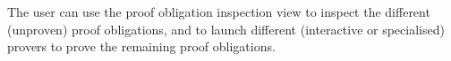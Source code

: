 
The user can use the proof obligation inspection view to inspect the
different (unproven) proof obligations, and to launch different
(interactive or specialised) provers to prove the remaining proof
obligations.

